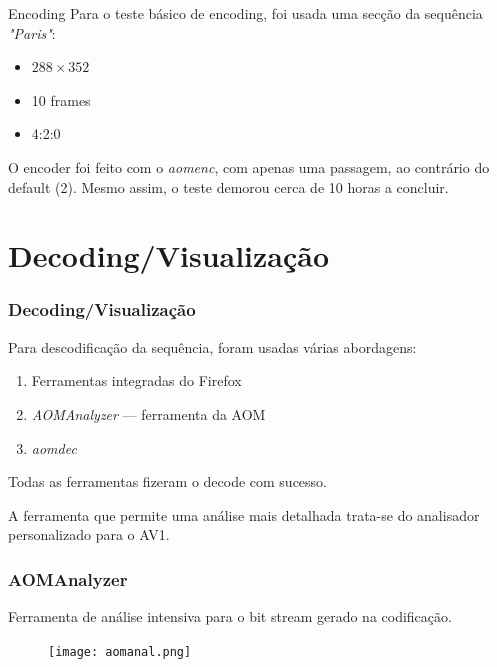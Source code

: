 \documentclass{beamer}
\begin{document}
\begin{frame}{Encoding}
	Para o teste básico de encoding, foi usada uma secção da sequência \textit{"Paris"}:
	\begin{itemize}
		\item $288 \times 352$
		\item 10 frames
		\item 4:2:0
	\end{itemize}
	
	O encoder foi feito com o \textit{aomenc}, com apenas uma passagem, ao contrário do default (2). Mesmo assim, o teste demorou cerca de 10 horas a concluir.
\end{frame}

\section{Decoding/Visualização}
\begin{frame}
	\frametitle{Decoding/Visualização}

	Para descodificação da sequência, foram usadas várias abordagens:

	\begin{enumerate}
		\item Ferramentas integradas do Firefox
		\item \textit{AOMAnalyzer} --- ferramenta da AOM
		\item \textit{aomdec}
	\end{enumerate}

	Todas as ferramentas fizeram o decode com sucesso.

	A ferramenta que permite uma análise mais detalhada trata-se do analisador personalizado para o AV1.
\end{frame}

\begin{frame}
	\frametitle{AOMAnalyzer}

	Ferramenta de análise intensiva para o bit stream gerado na codificação.

	\begin{figure}
		\centering
		\texttt{[image: aomanal.png]}
	\end{figure}
\end{frame}
\end{document}
